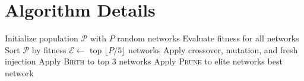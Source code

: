 \chapter{Algorithm Details}
\label{app:algorithm}

\begin{algorithm}[h]
  \caption{ModNet Evolution (full detail)}
  \label{alg:app-evolution}
  \begin{algorithmic}[1]
    \State Initialize population $\mathcal{P}$ with $P$ random networks
    \State Evaluate fitness for all networks
      \State Sort $\mathcal{P}$ by fitness
      \State $\mathcal{E} \gets$ top $\lfloor P/5 \rfloor$ networks
      \State Apply crossover, mutation, and fresh injection
        \State Apply \textsc{Birth} to top 3 networks
      \EndIf
        \State Apply \textsc{Prune} to elite networks
      \EndIf
    \EndFor
    \State \Return best network
  \end{algorithmic}
\end{algorithm}

